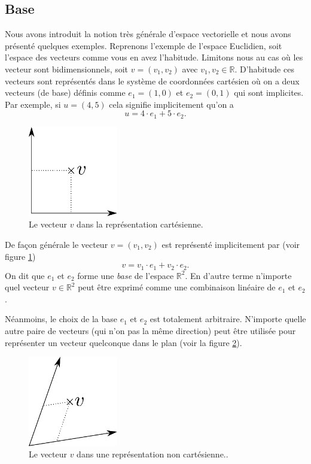 \documentclass[a4paper,12pt]{book}
\newcommand{\real}{\mathbb{R}}
\begin{document}
\subsection{Base}

Nous avons introduit la notion très générale d'espace vectorielle et nous avons présenté quelques exemples.
Reprenons l'exemple de l'espace Euclidien, soit l'espace des vecteurs comme vous en avez l'habitude. Limitons nous
au cas où les vecteur sont bidimensionnels, soit $v=(v_1,v_2)$ avec $v_1,v_2\in\real$. D'habitude ces vecteurs sont représentés 
dans le système de coordonnées cartésien où on a deux vecteurs (de base) définis comme $e_1=(1,0)$ et $e_2=(0,1)$ qui
sont implicites. Par exemple, si $u=(4,5)$ cela signifie implicitement qu'on a
\begin{equation}
 u=4\cdot e_1+5\cdot e_2.
\end{equation}
\begin{figure}[htp]
\begin{center}
\includegraphics[width=0.35\textwidth]{figs/baseCart.pdf}
\end{center}
\caption{Le vecteur $v$ dans la représentation cartésienne.}\label{fig_baseCart}
\end{figure}
De façon générale le vecteur $v=(v_1,v_2)$ est représenté implicitement par (voir figure \ref{fig_baseCart})
\begin{equation}
 v=v_1\cdot e_1+v_2\cdot e_2.
\end{equation}
On dit que $e_1$ et $e_2$ forme une \textit{base} de l'espace $\real^2$. En d'autre terme n'importe
quel vecteur $v\in\real^2$ peut être exprimé comme une combinaison linéaire de $e_1$ et $e_2$.

Néanmoins, le choix de la base $e_1$ et $e_2$ est totalement arbitraire. N'importe quelle autre paire de vecteurs (qui n'on pas la même 
direction) peut être utilisée pour représenter un vecteur quelconque dans le plan (voir la figure \ref{fig_baseNonCart}).
\begin{figure}[htp]
\begin{center}
\includegraphics[width=0.35\textwidth]{figs/baseNonCart.pdf}
\end{center}
\caption{Le vecteur $v$ dans une représentation non cartésienne..}\label{fig_baseNonCart}
\end{figure}
\end{document}
